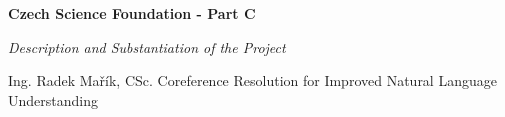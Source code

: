 \documentclass[11pt,american,oneside]{article}
\begin{document}
{\Large  \noindent \textbf{Czech Science Foundation - Part C}}

\begin{center}
	\Large \textit{Description and Substantiation of the Project}
\end{center}


\vspace{.25cm}
\begin{minipage}{.75\textwidth}
{\noindent

    \begin{description}[style=unboxed,leftmargin=0cm,labelindent=0cm]
        \customitem[Applicant:] Ing. Radek Mařík, CSc. 
         Coreference Resolution for Improved Natural Language Understanding
    \end{description}

}
\end{minipage}




\end{document}
